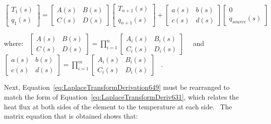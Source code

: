 \begin{equation}
\left[ {\begin{array}{ccc}{{T_1}\left( s \right)}\\ {{q_1}\left( s \right)}\end{array}} \right] = \left[ {\begin{array}{ccc}{A\left( s \right)}&{B\left( s \right)}\\ {C\left( s \right)}&{D\left( s \right)}\end{array}} \right]\left[ {\begin{array}{ccc}{{T_{n + 1}}\left( s \right)}\\ {{q_{n + 1}}\left( s \right)}\end{array}} \right] + \left[ {\begin{array}{ccc}{a\left( s \right)}&{b\left( s \right)}\\ {c\left( s \right)}&{d\left( s \right)}\end{array}} \right]\left[ {\begin{array}{ccc}0\\ {{q_{source}}\left( s \right)}\end{array}} \right]
\label{eq:LaplaceTransformDerivation649}
\end{equation}

where:~ \(\left[ {\begin{array}{ccc}{A\left( s \right)}&{B\left( s \right)}\\ {C\left( s \right)}&{D\left( s \right)}\end{array}} \right] = \prod\limits_{i = 1}^n {\left[ {\begin{array}{ccc}{{A_i}\left( s \right)}&{{B_i}\left( s \right)}\\ {{C_i}\left( s \right)}&{{D_i}\left( s \right)}\end{array}} \right]}\) ~~and~ \(\left[ {\begin{array}{ccc}{a\left( s \right)}&{b\left( s \right)}\\ {c\left( s \right)}&{d\left( s \right)}\end{array}} \right] = \prod\limits_{i = 1}^m {\left[ {\begin{array}{ccc}{{A_i}\left( s \right)}&{{B_i}\left( s \right)}\\ {{C_i}\left( s \right)}&{{D_i}\left( s \right)}\end{array}} \right]}\) ~.

Next, Equation~\ref{eq:LaplaceTransformDerivation649} must be rearranged to match the form of Equation~\ref{eq:LaplaceTransformDeriv631}, which relates the heat flux at both sides of the element to the temperature at each side.~ The matrix equation that is obtained shows that:

